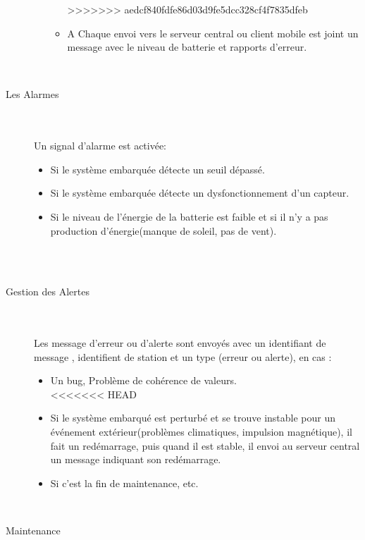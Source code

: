 \documentclass [a4paper] {report}
\begin{document}
\begin{description}
\begin{enumerate}
\begin{itemize}
>>>>>>> aedcf840fdfe86d03d9fe5dcc328cf4f7835dfeb
		\item A Chaque envoi vers le serveur central ou client mobile est joint un message avec le niveau de batterie et rapports d'erreur.\\
		\end{itemize}\hfill\\
	\end{enumerate}

\item [Les Alarmes]\hfill\\
	\\ Un signal d'alarme est activée:\\
	\begin{itemize}
		\item Si le système embarquée détecte un seuil dépassé.\\
		\item Si le système embarquée détecte un dysfonctionnement d'un capteur.\\
		\item Si le niveau de l'énergie de la batterie est faible et si il n'y a pas production d'énergie(manque de soleil, pas de vent).\\
	\end{itemize}\\
\hfill\\
\item [Gestion des Alertes]\hfill\\
	\\ Les message d'erreur ou d'alerte sont envoyés avec un identifiant de message , identifient de station et un type (erreur ou alerte), en cas  :\\
		\begin{itemize}
		\item Un bug, Problème de cohérence de valeurs.\\
<<<<<<< HEAD
		\item Si le système embarqué est perturbé et se trouve instable pour un événement extérieur(problèmes climatiques, impulsion magnétique), il fait un redémarrage, puis quand il est stable, il envoi au serveur central un message indiquant son redémarrage.  \\
		\item Si c'est la fin de maintenance, etc.
	\end{itemize}
\hfill\\
\item [Maintenance]\hfill\\
	\begin{itemize}

\end{itemize}
\end{description}
\end{document}
